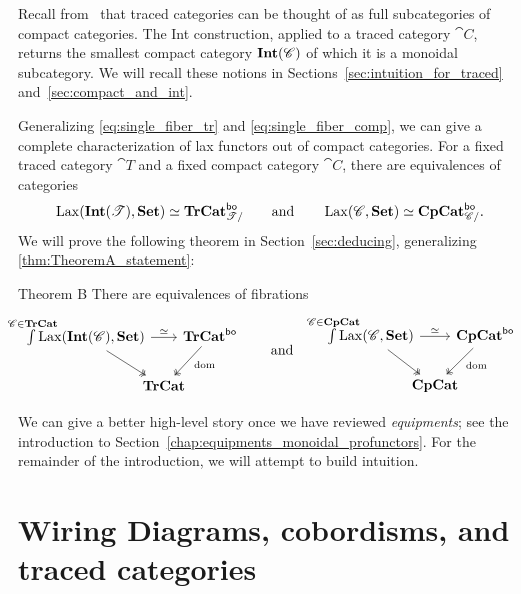 \documentclass[11pt,oneside,article]{memoir}
\begin{document}
Recall from~\cite{JoyalStreetVerity} that traced categories can be thought of as full subcategories
of compact categories.  The Int construction, applied to a traced category $\cat{C}$, returns the
smallest compact category $\mathbf{Int}(\mathscr{C})$ of which it is a monoidal subcategory. We will recall these
notions in Sections~\ref{sec:intuition_for_traced} and~\ref{sec:compact_and_int}.

Generalizing \eqref{eq:single_fiber_tr} and \eqref{eq:single_fiber_comp}, we can give a complete
characterization of lax functors out of compact categories. For a fixed traced category $\cat{T}$
and a fixed compact category $\cat{C}$, there are equivalences of categories
\begin{equation}
      \label{eqn:lax_compcat_bo}
   \operatorname{Lax}(\mathbf{Int}(\mathscr{T}),\mathbf{Set})\simeq\mathbf{TrCat}^{\mathsf{bo}}_{\mathscr{T}/}
   \qquad\text{and}\qquad
   \operatorname{Lax}(\mathscr{C},\mathbf{Set})\simeq\mathbf{CpCat}^{\mathsf{bo}}_{\mathscr{C}/}.
\end{equation}
We will prove the following theorem in Section~\ref{sec:deducing}, generalizing
\ref{thm:TheoremA_statement}:

\begin{named}{Theorem B}
      \label{thm:TheoremB_statement}
   There are equivalences of fibrations
   \begin{equation*}
      \begin{tikzcd}[column sep=-1em]
         \int\limits^{\mathclap{\cat{C}\in\TrCat}} \Lax(\Int(\cat{C}),\Set)
               \ar[rr,"\equiv"] \ar[dr,two heads]
            && \TrCat^{\bo} \ar[dl,two heads,"\dom" pos=.4] \\
         & \TrCat &
      \end{tikzcd}
      \qquad\text{and}\qquad
      \begin{tikzcd}[column sep=-1em]
         \int\limits^{\mathclap{\cat{C}\in\CompCat}} \Lax(\cat{C},\Set)
               \ar[rr,"\equiv"] \ar[dr,two heads]
            && \CompCat^{\bo} \ar[dl,two heads,"\dom" pos=.4] \\
         & \CompCat &
      \end{tikzcd}
   \end{equation*}
\end{named}

We can give a better high-level story once we have reviewed \emph{equipments}; see the introduction
to Section~\ref{chap:equipments_monoidal_profunctors}. For the remainder of the introduction, we
will attempt to build intuition.

\section{Wiring Diagrams, cobordisms, and traced categories}
\end{document}
